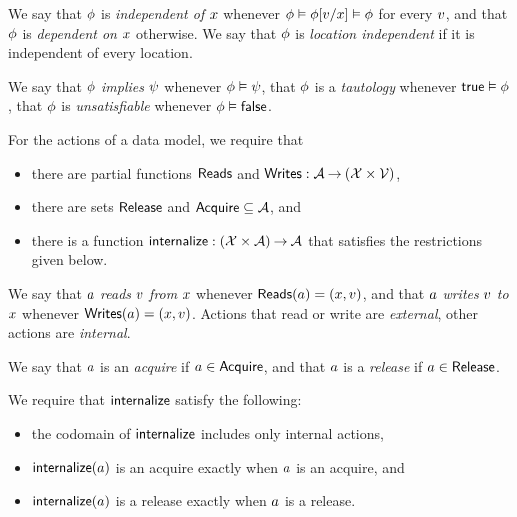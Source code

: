 We say that $\phi$ is \emph{independent of $x$} whenever
$\phi \vDash \phi[v/x] \vDash \phi$ for every $v$, and that
$\phi$ is \emph{dependent on $x$} otherwise.  We say that $\phi$ is
\emph{location independent} if it is independent of every location.

We say that $\phi$ \emph{implies} $\psi$ whenever $\phi\vDash\psi$,
that $\phi$ is a \emph{tautology} whenever $\mathsf{true}\vDash\phi$, that
$\phi$ is \emph{unsatisfiable} whenever $\phi\vDash\mathsf{false}$.

For the actions of a data model, we require that
\begin{itemize}
\item there are partial functions $\mathsf{Reads}$ and
  $\mathsf{Writes}: \mathcal{A} \mathbin\rightarrow (\mathcal{X} \times \mathcal{V})$,
\item there are sets $\mathsf{Release}$ and $\mathsf{Acquire} \subseteq\mathcal{A}$, and
\item there is a function $\mathsf{internalize}: (\mathcal{X}\times\mathcal{A}) \mathbin\rightarrow \mathcal{A}$ that
  satisfies the restrictions given below.
\end{itemize}

We say that $a$ \emph{reads} $v$ \emph{from} $x$ whenever
$\mathsf{Reads}(a) = (x,v)$, and that $a$ \emph{writes} $v$
\emph{to} $x$ whenever $\mathsf{Writes}(a) = (x,v)$.  Actions that
read or write are \emph{external}, other actions are \emph{internal}.

We say that $a$ is an \emph{acquire} if $a\in\mathsf{Acquire}$, and that $a$
is a \emph{release} if $a\in\mathsf{Release}$.  

We require that $\mathsf{internalize}$ satisfy the following:
\begin{itemize}
\item the codomain of $\mathsf{internalize}$ includes only internal actions, %
\item $\mathsf{internalize}(a)$ is an acquire exactly when $a$ is an acquire, and 
\item $\mathsf{internalize}(a)$ is a release exactly when $a$ is a release.
\end{itemize}


